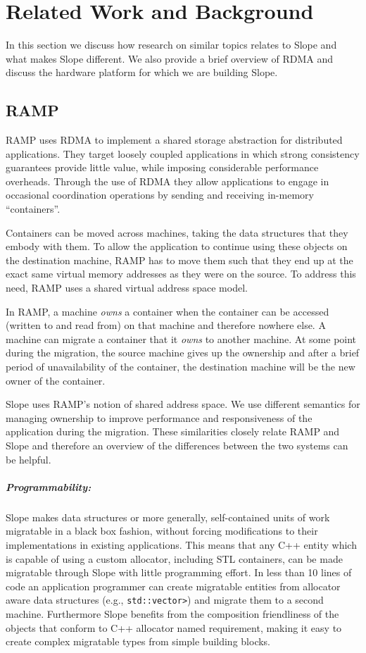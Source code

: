\chapter{Related Work and Background}
\label{chap:related}
In this section we discuss how research on similar topics relates to
Slope and what makes Slope different. We also provide a brief overview of
RDMA and discuss the hardware platform for which we are building Slope.

\section{RAMP}
RAMP\cite{memon2018ramp} uses RDMA to implement a shared storage abstraction
for distributed applications. They target loosely coupled applications in which
strong consistency guarantees provide little value, while imposing considerable
performance overheads. Through the use of RDMA they allow applications to engage in
occasional coordination operations by sending and receiving in-memory
``containers''.

Containers can be moved across machines, taking the data structures
that they embody with them. To allow the application to continue using these
objects on the destination machine, RAMP has to move them such that they
end up at the exact same
virtual memory addresses as they were on the source. To address this need,
RAMP uses a shared virtual address space model.

In RAMP, a machine \emph{owns} a container when the container can be accessed
(written to and read from)
on that machine and therefore nowhere else. A machine can migrate a container
that it \emph{owns} to another machine. At some point during the migration, the
source machine gives up the ownership and after a brief period of unavailability
of the container, the destination machine will be the new owner of the container.

Slope uses RAMP's notion of shared address space. We use different semantics
for managing ownership to improve performance and responsiveness of the application
during the migration. These similarities closely relate
RAMP and Slope and therefore an overview of the differences between the two
systems can be helpful.

\paragraph{Programmability:}

Slope makes data structures or more generally, self-contained units of
work migratable in a black box fashion, without forcing modifications to
their implementations in existing applications.
This means that any C++ entity which is capable of using a custom
allocator, including STL containers, can be made migratable through Slope
with little programming effort. In less than 10 lines of code an application
programmer can create
migratable entities from
allocator aware data structures (e.g., \texttt{std::vector>}) and migrate them to
a second machine. Furthermore Slope benefits
from the composition friendliness of the objects that conform to C++ 
allocator named requirement, making it easy to create complex migratable
types from simple building blocks.

